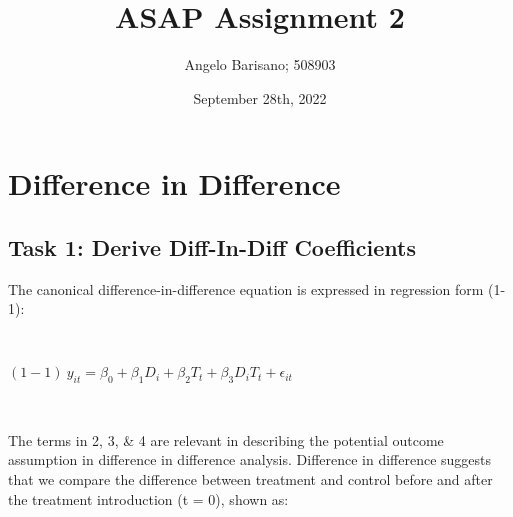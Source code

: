 \documentclass[a4paper]{article}
\begin{document}
\title{ASAP Assignment 2}
\author{Angelo Barisano; 508903 }
\date{September 28th, 2022}
\maketitle

\newpage
\section{Difference in Difference}






\subsection{Task 1: Derive Diff-In-Diff Coefficients}


The canonical difference-in-difference equation is expressed in regression form (1-1): 

\

$(1-1) \ {y_{it}} = \beta_{0} + \beta_{1} D_i + \beta_{2} T_t+ \beta_{3} D_i T_t + \epsilon_{it}$

\

%


The terms in 2, 3, \& 4 are relevant in describing the potential outcome assumption in difference in difference analysis. Difference in difference suggests that we compare the difference between treatment and control before and after the treatment introduction (t = 0), shown as:
\end{document}
